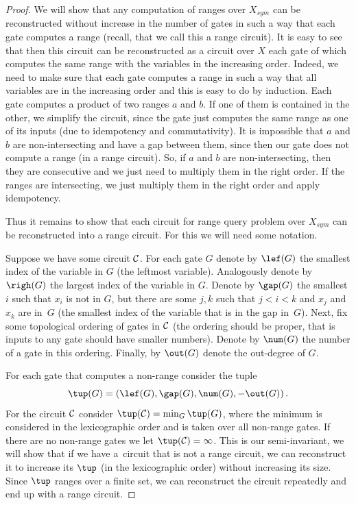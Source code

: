 \begin{proof}[Proof]
    We will show that any computation of ranges over $X_{sym}$ can be reconstructed without increase in the number of gates in such a way that each gate computes a range (recall, that we call this a range circuit). It is easy to see that then this circuit can be reconstructed as a circuit over $X$ each gate of which computes the same range with the variables in the increasing order. Indeed, we need to make sure that each gate computes a range in such a way that all variables are in the increasing order and this is easy to do by induction. Each gate computes a product of two ranges $a$ and $b$. If one of them is contained in the other, we simplify the circuit, since the gate just computes the same range as one of its inputs (due to idempotency and commutativity). It is impossible that $a$ and $b$ are non-intersecting and have a gap between them, since then our gate does not compute a range (in a range circuit). So, if $a$ and  $b$ are non-intersecting, then they are consecutive and we just need to multiply them in the right order. If the ranges are intersecting, we just multiply them in the right order and apply idempotency.

    Thus it remains to show that each circuit for range query problem over $X_{sym}$ can be reconstructed into a range circuit. For this we will need some notation.

    Suppose we have some circuit ${\cal C}$. For each gate $G$ denote by $\lef(G)$ the smallest index of the variable in $G$ (the leftmost variable). Analogously denote by $\righ(G)$ the largest index of the variable in $G$. Denote by $\gap(G)$ the smallest $i$ such that $x_i$ is not in $G$, but there are some $j,k$ such that $j<i<k$ and $x_j$ and $x_k$ are in~$G$ (the smallest index of the variable that is in the gap in~$G$).
    Next, fix some topological ordering of gates in ${\cal C}$ (the ordering should be proper, that is inputs to any gate should have smaller numbers). Denote by $\num(G)$ the number of a gate in this ordering. Finally, by $\out(G)$ denote the out-degree of $G$.

    For each gate that computes a non-range consider the tuple
    $$
    \tup(G)=(\lef(G),\gap(G),\num(G),-\out(G))\,.
    $$ For the circuit ${\cal C}$ consider $\tup({\cal C}) = \min_G \tup(G)$, where the minimum is considered in the lexicographic order and is taken over all non-range gates. If there are no non-range gates we let $\tup({\cal C})=\infty$. This is our semi-invariant, we will show that if we have a~circuit that is not a range circuit, we can reconstruct it to increase  its $\tup$ (in the lexicographic order) without increasing its size. Since $\tup$ ranges over a finite set, we can reconstruct the circuit repeatedly and end up with a range circuit.


\end{proof}
